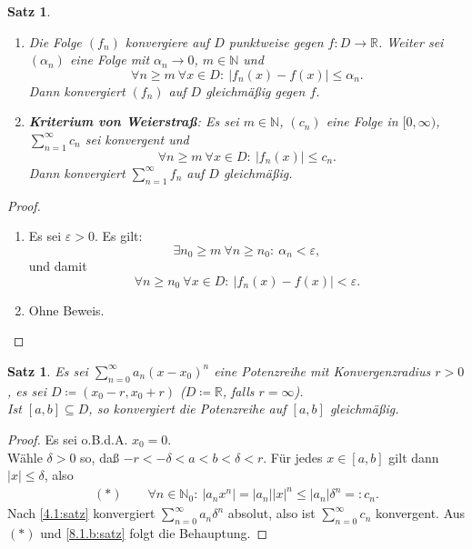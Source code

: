 \documentclass[12pt]{extreport} %
\newcommand{\N}{\mathbb{N}}
\newcommand{\R}{\mathbb{R}}
\theoremstyle{named}
\theoremstyle{itshape}
\newtheorem{satz}[unnamedtheorem]{Satz}
\theoremstyle{normal}
\begin{document}
{
\begin{satz} ~\ \label{8.1:satz}
	\begin{enumerate}
		\item Die Folge $(f_{n})$ konvergiere auf $D$ punktweise gegen $f \colon D \rightarrow \R$. Weiter sei $(\alpha_{n})$ eine Folge mit $\alpha_{n} \rightarrow 0$, $m \in \N$ und
			$$ \forall n \geq m ~\forall x \in D: ~  |f_{n}(x) - f(x) | \leq \alpha_{n}. $$
			Dann konvergiert $(f_{n})$ auf $D$ gleichmä{\ss}ig gegen $f$. \label{8.1.a:satz}
		\item \textbf{Kriterium von Weierstra{\ss}}: Es sei $m \in \N$, $(c_{n})$ eine Folge in $[0, \infty)$, $\sum_{n=1}^{\infty} c_{n}$ sei konvergent und
			$$\forall n \geq m ~\forall x \in D: ~  | f_{n}(x) | \leq c_{n}.  $$
			Dann konvergiert $\sum_{n=1}^{\infty} f_{n}$ auf $D$ gleichmä{\ss}ig. \label{8.1.b:satz}
	\end{enumerate}
\end{satz}

\begin{proof} ~\
	\begin{enumerate}
		\item Es sei $\varepsilon > 0$. Es gilt: 
		$$\exists n_{0} \geq m ~\forall n \geq n_{0}: ~ \alpha_{n} < \varepsilon,$$
		und damit
		$$\forall n \geq n_{0} ~\forall x \in D: ~ | f_{n}(x) - f(x) | < \varepsilon. $$
		\item Ohne Beweis.
	\end{enumerate}
\end{proof}


\begin{satz} \label{8.2:satz}
	Es sei $\sum_{n=0}^{\infty} a_{n} (x - x_{0})^{n}$ eine Potenzreihe mit Konvergenzradius $r > 0$, es sei $D \coloneqq (x_{0} - r, x_{0} + r)$ ($D \coloneqq \R$, 
	falls $r = \infty$). \\
	Ist $[a, b] \subseteq D$, so konvergiert die Potenzreihe auf $[a, b]$ gleichmä{\ss}ig.
\end{satz}

\begin{proof}
	Es sei o.B.d.A. $x_{0} = 0$. \\	
	Wähle $\delta > 0$ so, da{\ss} $-r < -\delta <a < b < \delta < r$. Für jedes $x \in [a, b]$ gilt dann $|x| \leq \delta$, also
		\begin{align*}
		(\ast) \quad \quad \forall n \in \N_0: ~ \left| a_{n} x^{n} \right| = |a_{n}| |x|^{n} \leq |a_{n}| \delta^{n} =: c_{n}. 
		\end{align*}
	Nach \ref{4.1:satz} konvergiert $\sum_{n=0}^{\infty} a_{n} \delta^{n}$ absolut, also ist $\sum_{n=0}^{\infty} c_{n}$ konvergent. Aus $(*)$ und \ref{8.1.b:satz}
	folgt die Behauptung.
\end{proof}


}
\end{document}
